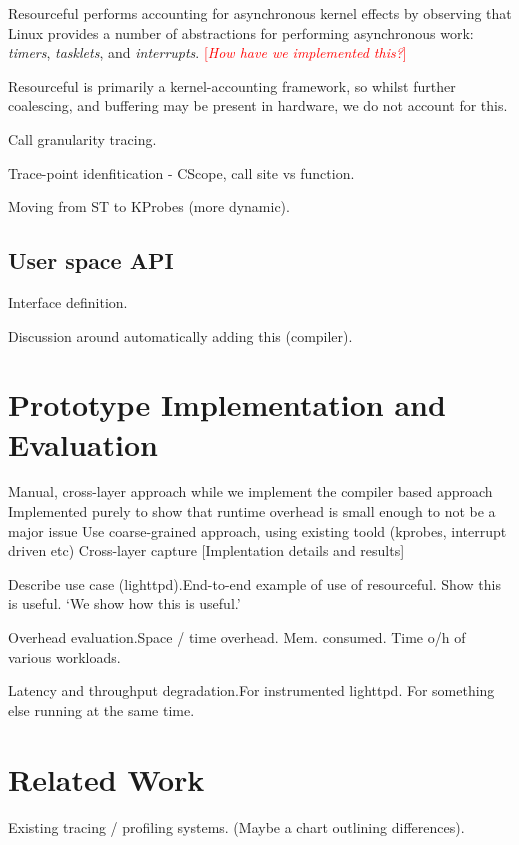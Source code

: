 \documentclass[letterpaper,twocolumn,10pt]{article}
\newcommand{\pname}{Resourceful}
\newcommand{\lnote}[1]{\textcolor{red}{[\textit{#1}]}} %
\begin{document}
\pname{ } performs accounting for asynchronous kernel effects by observing that
Linux provides a number of abstractions for performing asynchronous work:
\emph{timers}, \emph{tasklets}, and \emph{interrupts}. \lnote{How have we
implemented this?}

\pname{ } is primarily a kernel-accounting framework, so whilst further
coalescing, and buffering may be present in hardware, we do not account for
this.


Call granularity tracing.

Trace-point idenfitication - CScope, call site vs function.

Moving from ST to KProbes (more dynamic).

\subsection{User space API} Interface definition.

Discussion around automatically adding this (compiler).

\section{Prototype Implementation and Evaluation} Manual, cross-layer approach
while we implement the compiler based approach Implemented purely to show that
runtime overhead is small enough to not be a major issue Use coarse-grained
approach, using existing toold (kprobes, interrupt driven etc) Cross-layer
capture [Implentation details and results]

Describe use case (lighttpd).\newline End-to-end example of use of resourceful.
Show this is useful. `We show how this is useful.'

Overhead evaluation.\newline Space / time overhead. Mem. consumed. Time o/h of
various workloads.

Latency and throughput degradation.\newline For instrumented lighttpd. For
something else running at the same time.


\section{Related Work} Existing tracing / profiling systems. (Maybe a chart
outlining differences).
\end{document}
